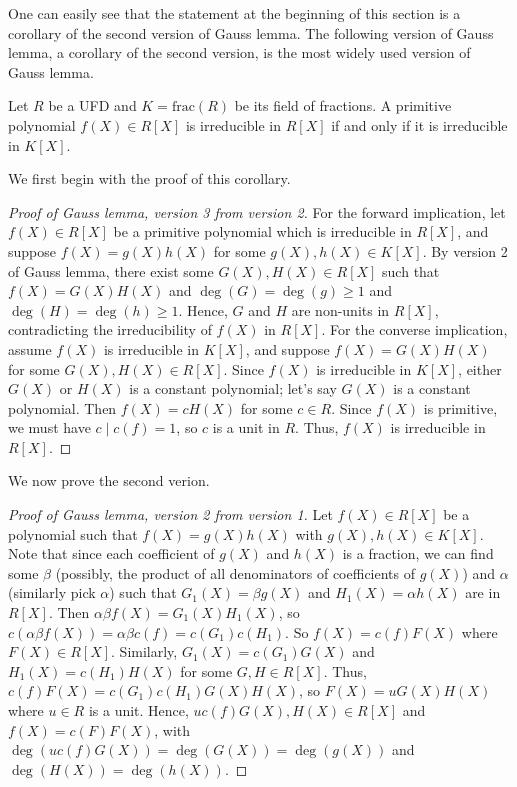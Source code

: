 One can easily see that the statement at the beginning of this section is a corollary of the second version of Gauss lemma. The following version of Gauss lemma, a corollary of the second version, is the most widely used version of Gauss lemma.

\begin{corollary}
    Let $R$ be a UFD and $K = \mathrm{frac}(R)$ be its field of fractions. A primitive polynomial $f(X) \in R[X]$ is irreducible in $R[X]$ if and only if it is irreducible in $K[X]$.
\end{corollary}

We first begin with the proof of this corollary.
\begin{proof}[Proof of Gauss lemma, version 3 from version 2]
    For the forward implication, let $f(X) \in R[X]$ be a primitive polynomial which is irreducible in $R[X]$, and suppose $f(X) = g(X) h(X)$ for some $g(X),h(X) \in K[X]$. By version 2 of Gauss lemma, there exist some $G(X),H(X) \in R[X]$ such that $f(X) = G(X) H(X)$ and $\deg(G) = \deg(g) \geq 1$ and $\deg(H) = \deg(h) \geq 1$. Hence, $G$ and $H$ are non-units in $R[X]$, contradicting the irreducibility of $f(X)$ in $R[X]$. For the converse implication, assume $f(X)$ is irreducible in $K[X]$, and suppose $f(X) = G(X) H(X)$ for some $G(X),H(X) \in R[X]$. Since $f(X)$ is irreducible in $K[X]$, either $G(X)$ or $H(X)$ is a constant polynomial; let's say $G(X)$ is a constant polynomial. Then $f(X) = cH(X)$ for some $c \in R$. Since $f(X)$ is primitive, we must have $c \mid c(f) = 1$, so $c$ is a unit in $R$. Thus, $f(X)$ is irreducible in $R[X]$.
\end{proof}

We now prove the second verion.
\begin{proof}[Proof of Gauss lemma, version 2 from version 1]
    Let $f(X) \in R[X]$ be a polynomial such that $f(X) = g(X) h(X)$ with $g(X), h(X) \in K[X]$. Note that since each coefficient of $g(X)$ and $h(X)$ is a fraction, we can find some $\beta$ (possibly, the product of all denominators of coefficients of $g(X)$) and $\alpha$ (similarly pick $\alpha$) such that $G_{1}(X) = \beta g(X)$ and $H_{1}(X) = \alpha h(X)$ are in $R[X]$. Then $\alpha \beta f(X) = G_{1}(X) H_{1}(X)$, so $c(\alpha \beta f(X)) = \alpha \beta c(f) = c(G_{1}) c(H_{1})$. So $f(X) = c(f) F(X)$ where $F(X) \in R[X]$. Similarly, $G_{1}(X) = c(G_{1}) G(X)$ and $H_{1}(X) = c(H_{1}) H(X)$ for some $G,H \in R[X]$. Thus, $c(f) F(X) = c(G_{1}) c(H_{1}) G(X) H(X)$, so $F(X) = u G(X) H(X)$ where $u \in R$ is a unit. Hence, $u c(f) G(X), H(X) \in R[X]$ and $f(X) = c(F) F(X)$, with $\deg (u c (f) G(X)) = \deg (G(X)) = \deg(g(X))$ and $\deg(H(X)) = \deg(h(X))$.
\end{proof}

